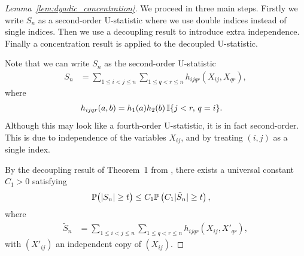 \begin{proof}[Lemma~\ref{lem:dyadic_concentration}]

  We proceed in three main steps.
  Firstly we write $S_n$ as a second-order U-statistic
  where we use double indices instead of single indices.
  Then we use a decoupling result to introduce extra independence.
  Finally a concentration result is applied
  to the decoupled U-statistic.


  Note that we can write $S_n$ as
  the second-order U-statistic
  \begin{align*}
    S_n
    &=
    \sum_{1 \leq i < j \leq n}
    \sum_{1 \leq q < r \leq n}
    h_{i j q r}
    (X_{i j}, X_{qr}),
  \end{align*}
  where
  \begin{align*}
    h_{i j q r}
    (a,b)
    &=
    h_1(a) h_2(b) \,
    \I\{j<r,\, q=i\}.
  \end{align*}
  Although this may look like a fourth-order
  U-statistic,
  it is in fact second-order.
  This is due to independence of the variables
  $X_{i j}$,
  and by treating $(i,j)$ as a single index.


  By the decoupling result of Theorem~1
  from \citet{de1995decoupling}, there exists a universal
  constant $C_1 > 0$ satisfying
  \begin{align*}
    \P\big(
      |S_n| \geq t
    \big)
    &\leq
    C_1 \P\left(
      C_1 |\tilde S_n| \geq t
    \right),
  \end{align*}
  where
  \begin{align*}
    \tilde S_n
    &=
    \sum_{1 \leq i < j \leq n}
    \sum_{1 \leq q < r \leq n}
    h_{i j q r}
    (X_{i j}, X'_{qr}),
  \end{align*}
  with $(X'_{i j})$
  an independent copy of $(X_{i j})$.



\end{proof}
